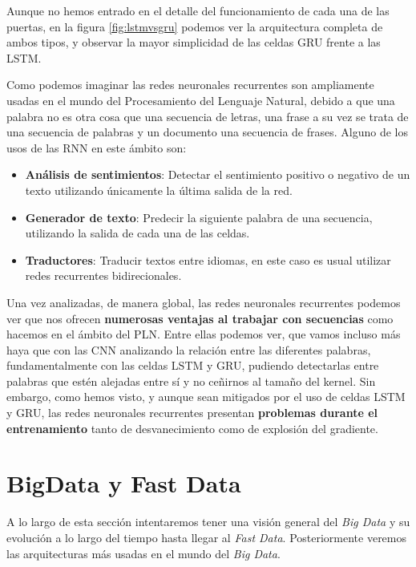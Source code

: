 Aunque no hemos entrado en el detalle del funcionamiento de cada una de las puertas, en la figura \ref{fig:lstmvsgru} podemos ver la arquitectura completa de ambos tipos, y observar la mayor simplicidad de las celdas GRU frente a las LSTM. 


Como podemos imaginar las redes neuronales recurrentes son ampliamente usadas en el mundo del Procesamiento del Lenguaje Natural, debido a que una palabra no es otra cosa que una secuencia de letras, una frase a su vez se trata de una secuencia de palabras y un documento una secuencia de frases. Alguno de los usos de las RNN en este ámbito son: 

\begin{itemize}
	\item \textbf{Análisis de sentimientos}: Detectar el sentimiento positivo o negativo de un texto utilizando únicamente la última salida de la red.
	\item \textbf{Generador de texto}: Predecir la siguiente palabra de una secuencia, utilizando la salida de cada una de las celdas. 
	\item \textbf{Traductores}: Traducir textos entre idiomas, en este caso es usual utilizar redes recurrentes bidirecionales.
\end{itemize}



Una vez analizadas, de manera global, las redes neuronales recurrentes podemos ver que nos ofrecen \textbf{numerosas ventajas al trabajar con secuencias} como hacemos en el ámbito del PLN. Entre ellas podemos ver, que vamos incluso más haya que con las CNN analizando la relación entre las diferentes palabras, fundamentalmente con las celdas LSTM y GRU, pudiendo detectarlas entre palabras que estén alejadas entre sí y no ceñirnos al tamaño del kernel. Sin embargo, como hemos visto, y aunque sean mitigados por el uso de celdas LSTM y GRU, las redes neuronales recurrentes presentan \textbf{problemas durante el entrenamiento} tanto de desvanecimiento como de explosión del gradiente.


\section{BigData y Fast Data}
\label{section:arte:big}
A lo largo de esta sección intentaremos tener una visión general del \textit{Big Data} y su evolución a lo largo del tiempo hasta llegar al \textit{Fast Data}. Posteriormente veremos las arquitecturas más usadas en el mundo del \textit{Big Data}. 


